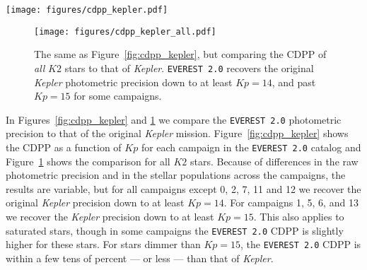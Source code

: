 \documentclass[]{aastex62}
\newcommand{\Kp}{\ensuremath{Kp}}
\newcommand{\edited}[1]{{\color{red} #1}}
\begin{document}
\begin{figure*}[hbt]
  \begin{center}
      \texttt{[image: figures/cdpp\_kepler.pdf]}
       \caption{6 hr photometric precision as a function of \emph{Kepler} magnitude $\Kp$ for all
       stars observed by \emph{Kepler} (yellow dots) and for all $K2$ targets in Campaigns 0-8
       de-trended with \texttt{EVEREST} (blue). The median in 0.5 magnitude-wide bins is indicated
       by yellow circles for \emph{Kepler} and by blue circles for \texttt{EVEREST}. For campaigns
       1, 5, and 6, \texttt{EVEREST} recovers the raw \emph{Kepler} photometric precision down to
       at least $\Kp = 15$; for campaigns 3, 4, and 8, \texttt{EVEREST} recovers the \emph{Kepler}
       precision down to $\Kp = 14$. Campaigns 0 and 2 have a larger fraction of (variable) giant
       stars, leading to a higher average CDPP, while campaign 7 raw light curves
       have significantly worse precision due to increased
       spacecraft motion caused by torque imbalances on the spacecraft during this campaign.
       \edited{Campaign 11 light curves display a similar excess in residual noise, in particular during the first
       sub-campaign. Like campaign 7, this campaign observed targets near the galactic bulge, where
       crowding also contributed to poorer performance than average.}}
     \label{fig:cdpp_kepler}
  \end{center}
\end{figure*}

\begin{figure}[hbt]
  \begin{center}
      \texttt{[image: figures/cdpp\_kepler\_all.pdf]}
       \caption{The same as Figure~\ref{fig:cdpp_kepler}, but comparing the CDPP of \emph{all} $K2$ stars
                to that of \emph{Kepler}. \texttt{EVEREST 2.0} recovers the original \emph{Kepler}
                photometric precision down to at least $\Kp = 14$, and past $\Kp = 15$ for some
                campaigns.}
     \label{fig:cdpp_kepler_all}
  \end{center}
\end{figure}

In Figures~\ref{fig:cdpp_kepler} and \ref{fig:cdpp_kepler_all} we compare the \texttt{EVEREST 2.0}
photometric precision to that of the original \emph{Kepler} mission. Figure~\ref{fig:cdpp_kepler}
shows the CDPP as a function of $\Kp$ for each \edited{campaign in the \texttt{EVEREST 2.0} catalog} and
Figure~\ref{fig:cdpp_kepler_all} shows the comparison for all $K2$ stars. Because of differences
in the raw photometric precision and in the stellar populations across the campaigns, the
results are variable, but for all campaigns except \edited{0, 2, 7, 11 and 12} we recover the original \emph{Kepler}
precision down to at least $\Kp = 14$. For campaigns \edited{1, 5, 6, and 13} we recover the \emph{Kepler}
precision down to at least $\Kp = 15$. This also applies to saturated stars, though in some
campaigns the \texttt{EVEREST 2.0} CDPP is slightly higher for these stars. For stars
dimmer than $\Kp = 15$, the \texttt{EVEREST 2.0} CDPP is within a few tens of percent ---
or less --- than that of \emph{Kepler}.
\end{document}
